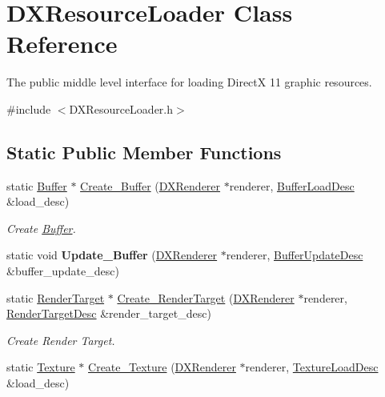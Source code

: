 \hypertarget{classDXResourceLoader}{}\section{D\+X\+Resource\+Loader Class Reference}
\label{classDXResourceLoader}


The public middle level interface for loading DirectX 11 graphic resources.  




{\ttfamily \#include $<$D\+X\+Resource\+Loader.\+h$>$}

\subsection*{Static Public Member Functions}
\begin{DoxyCompactItemize}
\item 
static \hyperlink{classBuffer}{Buffer} $\ast$ \hyperlink{classDXResourceLoader_a771cd595ba597d3e048e5d7120d1c0ef}{Create\+\_\+\+Buffer} (\hyperlink{classDXRenderer}{D\+X\+Renderer} $\ast$renderer, \hyperlink{structBufferLoadDesc}{Buffer\+Load\+Desc} \&load\+\_\+desc)
\begin{DoxyCompactList}\small\item\em Create \hyperlink{classBuffer}{Buffer}. \end{DoxyCompactList}\item 
\mbox{\label{classDXResourceLoader_a2ff7bd4c1bafec9f9be8d245e11a9b5a}} 
static void {\bfseries Update\+\_\+\+Buffer} (\hyperlink{classDXRenderer}{D\+X\+Renderer} $\ast$renderer, \hyperlink{structBufferUpdateDesc}{Buffer\+Update\+Desc} \&buffer\+\_\+update\+\_\+desc)
\item 
static \hyperlink{classRenderTarget}{Render\+Target} $\ast$ \hyperlink{classDXResourceLoader_ae0466f57fe0391dd008e6810a27abf3e}{Create\+\_\+\+Render\+Target} (\hyperlink{classDXRenderer}{D\+X\+Renderer} $\ast$renderer, \hyperlink{structRenderTargetDesc}{Render\+Target\+Desc} \&render\+\_\+target\+\_\+desc)
\begin{DoxyCompactList}\small\item\em Create Render Target. \end{DoxyCompactList}\item 
static \hyperlink{classTexture}{Texture} $\ast$ \hyperlink{classDXResourceLoader_a8c8513cb2314e5d67aa60ef0d8c0d039}{Create\+\_\+\+Texture} (\hyperlink{classDXRenderer}{D\+X\+Renderer} $\ast$renderer, \hyperlink{structTextureLoadDesc}{Texture\+Load\+Desc} \&load\+\_\+desc)

\end{DoxyCompactItemize}
